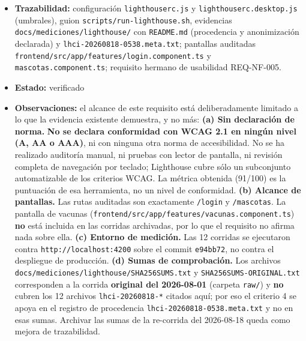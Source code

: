\documentclass[
  spanish,
]{article}
\begin{document}
\begin{itemize}
  los dos perfiles con sus respectivas configuraciones.
\item
  \textbf{Trazabilidad:} configuración \texttt{lighthouserc.\allowbreak{}js} y
  \texttt{lighthouserc.\allowbreak{}desktop.\allowbreak{}js} (umbrales), guion
  \texttt{scripts/\allowbreak{}run-\allowbreak{}lighthouse.\allowbreak{}sh}, evidencias
  \texttt{docs/\allowbreak{}mediciones/\allowbreak{}lighthouse/} con \texttt{README.\allowbreak{}md}
  (procedencia y anonimización declarada) y
  \texttt{lhci-\allowbreak{}20260818-\allowbreak{}0538.\allowbreak{}meta.\allowbreak{}txt}; pantallas auditadas
  \texttt{frontend/\allowbreak{}src/\allowbreak{}app/\allowbreak{}features/\allowbreak{}login.\allowbreak{}component.\allowbreak{}ts} y
  \texttt{mascotas.\allowbreak{}component.\allowbreak{}ts}; requisito hermano de usabilidad
  REQ-NF-005.
\item
  \textbf{Estado:} verificado
\item
  \textbf{Observaciones:} el alcance de este requisito está
  deliberadamente limitado a lo que la evidencia existente demuestra, y
  no más: \textbf{(a) Sin declaración de norma.} \textbf{No se declara
  conformidad con WCAG 2.1 en ningún nivel (A, AA o AAA)}, ni con
  ninguna otra norma de accesibilidad. No se ha realizado auditoría
  manual, ni pruebas con lector de pantalla, ni revisión completa de
  navegación por teclado; Lighthouse cubre sólo un subconjunto
  automatizable de los criterios WCAG. La métrica obtenida (91/100) es
  la puntuación de esa herramienta, no un nivel de conformidad.
  \textbf{(b) Alcance de pantallas.} Las rutas auditadas son exactamente
  \texttt{/\allowbreak{}login} y \texttt{/\allowbreak{}mascotas}. La pantalla de vacunas
  (\texttt{frontend/\allowbreak{}src/\allowbreak{}app/\allowbreak{}features/\allowbreak{}vacunas.\allowbreak{}component.\allowbreak{}ts}) \textbf{no}
  está incluida en las corridas archivadas, por lo que el requisito no
  afirma nada sobre ella. \textbf{(c) Entorno de medición.} Las 12
  corridas se ejecutaron contra \texttt{http:/\allowbreak{}/\allowbreak{}localhost:4200} sobre el
  commit \texttt{e94bb72}, no contra el despliegue de producción.
  \textbf{(d) Sumas de comprobación.} Los archivos
  \texttt{docs/\allowbreak{}mediciones/\allowbreak{}lighthouse/\allowbreak{}SHA256\allowbreak{}SUMS.\allowbreak{}txt} y
  \texttt{SHA256\allowbreak{}SUMS-\allowbreak{}ORIGINAL.\allowbreak{}txt} corresponden a la corrida
  \textbf{original del 2026-08-01} (carpeta \texttt{raw/}) y \textbf{no}
  cubren los 12 archivos \texttt{lhci-\allowbreak{}20260818-*} citados aquí; por eso
  el criterio 4 se apoya en el registro de procedencia
  \texttt{lhci-\allowbreak{}20260818-\allowbreak{}0538.\allowbreak{}meta.\allowbreak{}txt} y no en esas sumas. Archivar las
  sumas de la re-corrida del 2026-08-18 queda como mejora de
  trazabilidad.
\end{itemize}
\end{document}
